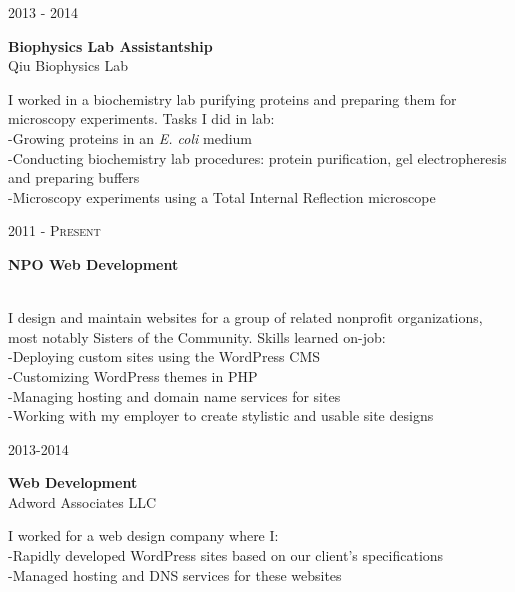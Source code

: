 \documentclass[10pt]{article} %
\begin{document}
{\begin{minipage}[t]{0.5\textwidth}

{\raggedleft\textsc{2013 - 2014}\par}

{\raggedright\large \textbf{Biophysics Lab Assistantship}\\
{Qiu Biophysics Lab}\\[5pt]}
\normalsize{I worked in a biochemistry lab purifying proteins and preparing them for microscopy experiments. Tasks I did in lab:}\\
\hspace*{0.2in}-Growing proteins in an \textit{E. coli} medium\\
\hspace*{0.2in}-Conducting biochemistry lab procedures: protein purification, gel electropheresis and preparing buffers \\
\hspace*{0.2in}-Microscopy experiments using a Total Internal Reflection microscope


{\raggedleft\textsc{2011 - Present}\par}

{\raggedright\large \textbf{NPO Web Development}}\\
\normalsize{I design and maintain websites for a group of related nonprofit organizations, most notably Sisters of the Community. Skills learned on-job:}\\
\hspace*{0.2in}-Deploying custom sites using the WordPress CMS \\
\hspace*{0.2in}-Customizing WordPress themes in PHP \\
\hspace*{0.2in}-Managing hosting and domain name services for sites \\
\hspace*{0.2in}-Working with my employer to create stylistic and usable site designs \\


{\raggedleft\textsc{2013-2014}\par}
{\raggedright\large \textbf{Web Development}\\
{Adword Associates LLC}\\[5pt]}
\normalsize{I worked for a web design company where I:}\\
\hspace*{0.2in}-Rapidly developed WordPress sites based on our client's specifications\\
\hspace*{0.2in}-Managed hosting and DNS services for these websites\\


\end{minipage}}
\end{document}

